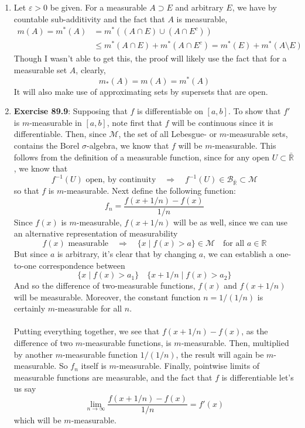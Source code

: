 \documentclass[12pt]{article}
\theoremstyle{plain}
\theoremstyle{definition}
\theoremstyle{remark}
\begin{document}
\begin{enumerate}
\item Let $\varepsilon>0$ be given. For a measurable $A\supset E$ and arbitrary $E$, we have by countable sub-additivity and the fact that $A$ is measurable,
\begin{align*}
    m(A) = m^*(A)&= m^*((A\cap E) \cup (A\cap E^c)) \\
    &\leq m^*(A\cap E) + m^*(A\cap E^c) 
    = m^*(E) + m^*(A\setminus E) 
\end{align*}
Though I wasn't able to get this, the proof will likely use the fact that for a measurable set $A$, clearly,
\[
    m_*(A) = m(A) = m^*(A)
\]
It will also make use of approximating sets by supersets that are open.



\item \textbf{Exercise 89.9}: Supposing that $f$ is differentiable on $[a,b]$. To show that $f'$ is $m$-measurable in $[a,b]$, note first that $f$ will be continuous since it is differentiable. Then, since $\mathscr{M}$, the set of all Lebesgue- or $m$-measurable  sets, contains the Borel $\sigma$-algebra, we know that $f$ will be $m$-measurable. This follows from the definition of a measurable function, since for any open $U\subset \bar{\mathbb{R}}$, we know that 
\[
    f^{-1}(U) \text{ open, by continuity} 
    \quad \Rightarrow \quad
    f^{-1}(U) \in \mathscr{B}_{\bar{\mathbb{R}}} \subset \mathscr{M}
\]
so that $f$ is $m$-measurable. Next define the following function:
\[
    f_n = \frac{f(x+1/n) - f(x)}{1/n}
\]
Since $f(x)$ is $m$-measurable, $f(x+1/n)$ will be as well, since we can use an alternative representation of measurability
\[
    f(x) \text{ measurable}
    \quad \Rightarrow \quad
    \{x \; | \; f(x)> a \} \in \mathscr{M} \quad 
    \text{for all $a\in\mathbb{R}$}
\]
But since $a$ is arbitrary, it's clear that by changing $a$, we can establish a one-to-one correspondence between 
\[
    \{x \; | \; f(x)> a_1 \} \quad
    \{x + 1/n \; | \; f(x)> a_2 \}
\]
And so the difference of two-measurable functions, $f(x)$ and $f(x+1/n)$ will be measurable. Moreover, the constant function $n = 1/(1/n)$ is certainly $m$-measurable for all $n$.
\\
\\ 
Putting everything together, we see that $f(x + 1/n) - f(x)$, as the difference of two $m$-measurable functions, is $m$-measurable. Then, multiplied by another $m$-measurable function $1/(1/n)$, the result will again be $m$-measurable. So $f_n$ itself is $m$-measurable. Finally, pointwise limits of measurable functions are measurable, and the fact that $f$ is differentiable let's us say
\[
    \lim_{n\rightarrow\infty} 
    \frac{f(x+1/n) - f(x)}{1/n} = f'(x)
\]
which will be $m$-measurable.


\end{enumerate}
\end{document}
